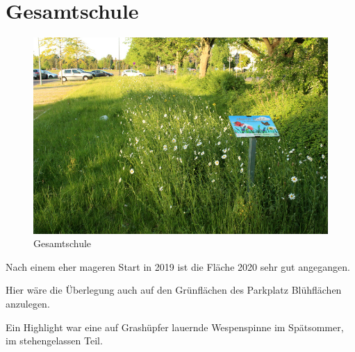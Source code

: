 \documentclass[10pt]{article}
\begin{document}
\section{Gesamtschule}
\begin{figure}[h!]
  \includegraphics[width=\linewidth]{img/gesamtschule/mai.jpg}
  \caption{Gesamtschule}
  \label{fig:boat1}
\end{figure}

Nach einem eher mageren Start in 2019 ist die Fläche 2020 sehr gut angegangen.

Hier wäre die Überlegung auch auf den Grünflächen des Parkplatz Blühflächen anzulegen.

Ein Highlight war eine auf Grashüpfer lauernde Wespenspinne im Spätsommer, im stehengelassen Teil.
\end{document}
